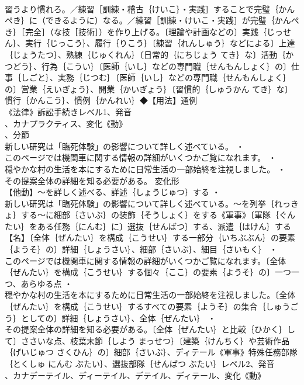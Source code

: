 \documentclass[8pt]{extreport}
\begin{document}
\begin{CJK}{UTF8}{min}
\\	習うより慣れろ。／練習［訓練・稽古｛けいこ｝・実践］することで完璧｛かんぺき｝に（できるように）なる。／練習［訓練・けいこ・実践］が完璧｛かんぺき｝［完全］（な技［技術］）を作り上げる。〔理論や計画などの〕実践｛じっせん｝、実行｛じっこう｝、履行｛りこう｝〔練習｛れんしゅう｝などによる〕上達｛じょうたつ｝、熟練｛じゅくれん｝〔日常的｛にちじょう てき｝な〕活動｛かつどう｝、行為｛こうい｝〔医師｛いし｝などの専門職｛せんもんしょく｝の〕仕事｛しごと｝、実務｛じつむ｝〔医師｛いし｝などの専門職｛せんもんしょく｝の〕営業｛えいぎょう｝、開業｛かいぎょう｝〔習慣的｛しゅうかん てき｝な〕慣行｛かんこう｝、慣例｛かんれい｝◆【用法】通例
\\	《法律》訴訟手続きレベル1、発音
\\	、カナプラクティス、変化《動》
\\	、分節
\\	新しい研究は「臨死体験」の影響について詳しく述べている。 ・
\\	このページでは機関車に関する情報の詳細がいくつかご覧になれます。 ・
\\	穏やかな村の生活を本にするために日常生活の一部始終を注視しました。 ・
\\	その提案全体の詳細を知る必要がある。	変化形 
\\	【他動】～を詳しく述べる、詳述｛しょうじゅつ｝する ・
\\	新しい研究は「臨死体験」の影響について詳しく述べている。～を列挙｛れっきょ｝する～に細部｛さいぶ｝の装飾｛そうしょく｝をする《軍事》〔軍隊｛ぐんたい｝をある任務｛にんむ｝に〕選抜｛せんばつ｝する、派遣｛はけん｝する【名】〔全体｛ぜんたい｝を構成｛こうせい｝する一部分｛いちぶぶん｝の要素｛ようそ｝の〕詳細｛しょうさい｝、細部｛さいぶ｝、細目｛さいもく｝ ・
\\	このページでは機関車に関する情報の詳細がいくつかご覧になれます。〔全体｛ぜんたい｝を構成｛こうせい｝する個々｛ここ｝の要素｛ようそ｝の〕一つ一つ、あらゆる点 ・
\\	穏やかな村の生活を本にするために日常生活の一部始終を注視しました。〔全体｛ぜんたい｝を構成｛こうせい｝するすべての要素｛ようそ｝の集合｛しゅうごう｝としての〕詳細｛しょうさい｝、全体｛ぜんたい｝ ・
\\	その提案全体の詳細を知る必要がある。〔全体｛ぜんたい｝と比較｛ひかく｝して〕ささいな点、枝葉末節｛しよう まっせつ｝〔建築｛けんちく｝や芸術作品｛げいじゅつ さくひん｝の〕細部｛さいぶ｝、ディテール《軍事》特殊任務部隊｛とくしゅ にんむ ぶたい｝、選抜部隊｛せんばつ ぶたい｝レベル2、発音
\\	、カナデーテイル、ディーテイル、デテイル、ディテール、変化《動》

\end{CJK}
\end{document}
